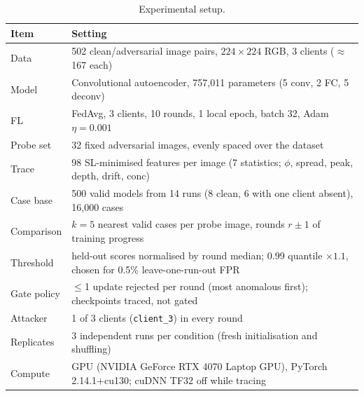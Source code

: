 \begin{table}[!t]
\centering
\caption{Experimental setup.}
\label{tab:setup}
\footnotesize
\setlength{\tabcolsep}{4pt}
\begin{tabular}{@{}ll@{}}
\toprule
\textbf{Item} & \textbf{Setting} \\
\midrule
Data & 502 clean/adversarial image pairs, $224\times224$ RGB, 3 clients ($\approx$167 each) \\
Model & Convolutional autoencoder, 757{,}011 parameters (5 conv, 2 FC, 5 deconv) \\
FL & FedAvg, 3 clients, 10 rounds, 1 local epoch, batch 32, Adam $\eta{=}0.001$ \\
Probe set & 32 fixed adversarial images, evenly spaced over the dataset \\
Trace & 98 SL-minimised features per image (7 statistics; $\phi$, spread, peak, depth, drift, conc) \\
Case base & 500 valid models from 14 runs (8 clean{,} 6 with one client absent){,} 16{,}000 cases \\
Comparison & $k{=}5$ nearest valid cases per probe image, rounds $r\pm1$ of training progress \\
Threshold & held-out scores normalised by round median; 0.99 quantile $\times 1.1$, chosen for 0.5\% leave-one-run-out FPR \\
Gate policy & $\le$1 update rejected per round (most anomalous first); checkpoints traced, not gated \\
Attacker & 1 of 3 clients (\texttt{client\_3}) in every round \\
Replicates & 3 independent runs per condition (fresh initialisation and shuffling) \\
Compute & GPU (NVIDIA GeForce RTX 4070 Laptop GPU), PyTorch 2.14.1+cu130; cuDNN TF32 off while tracing \\
\bottomrule
\end{tabular}
\end{table}
